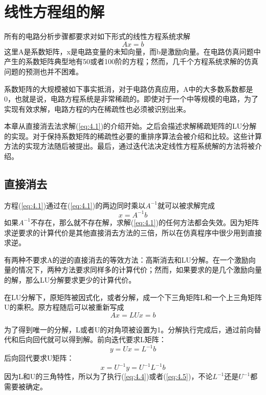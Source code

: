 \chapter{线性方程组的解}
\label{chap:4}
所有的电路分析步骤都要求对如下形式的线性方程系统求解
\begin{equation}
    Ax = b
    \label{eq:4.1}
\end{equation}
这里A是系数矩阵，x是电路变量的未知向量，而b是激励向量。在电路仿真问题中产生的系数矩阵典型地有50或者100阶的方程；然而，几千个方程系统求解的仿真问题的预测也并不困难。

系数矩阵的大规模被如下事实抵消，对于电路仿真应用，A中的大多数系数都是0，也就是说，电路方程系统是非常稀疏的。即使对于一个中等规模的电路，为了实现有效求解，电路方程的内在稀疏性也必须被识别出来。

本章从直接消去法求解(\ref{eq:4.1})的介绍开始。之后会描述求解稀疏矩阵的LU分解的实现。对于保持系数矩阵的稀疏性必要的重排序算法会被介绍和比较。这些计算方法的实现方法随后被提出。最后，通过迭代法决定线性方程系统解的方法将被介绍。

\section{直接消去}
方程(\ref{eq:4.1})通过在(\ref{eq:4.1})的两边同时乘以$A^{-1}$就可以被求解完成
\begin{equation}
    x = A^{-1}b
    \label{eq:4.2}
\end{equation}
如果$A^{-1}$不存在，那么就不存在解，求解(\ref{eq:4.1})的任何方法都会失效。因为矩阵求逆要求的计算代价是其他直接消去方法的三倍\cite{ref-49}，所以在仿真程序中很少用到直接求逆。

有两种不要求A的逆的直接消去的等效方法：高斯消去和LU分解。在一个激励向量的情况下，两种方法要求同样多的计算代价；然而，如果要求的是几个激励向量的解，那么LU分解要求更少的计算代价\cite{ref-35}。

在LU分解下，原矩阵被因式化，或者分解，成一个下三角矩阵L和一个上三角矩阵U的乘积。原方程随后可以被重新写成
\begin{equation}
    Ax = LUx = b
    \label{eq:4.3}
\end{equation}

为了得到唯一的分解，L或者U的对角项被设置为1。分解执行完成后，通过前向替代和后向回代就可以得到解。前向迭代要求L矩阵：
\begin{equation}
    y = Ux = L^{-1}b
    \label{eq:4.4}
\end{equation}
后向回代要求U矩阵：
\begin{equation}
    x = U^{-1}y = U^{-1}L^{-1}b
    \label{eq:4.5}
\end{equation}
因为L和U的三角特性，所以为了执行(\ref{eq:4.4})或者(\ref{eq:4.5})，不论$L^{-1}$还是$U^{-1}$都需要被确定。

